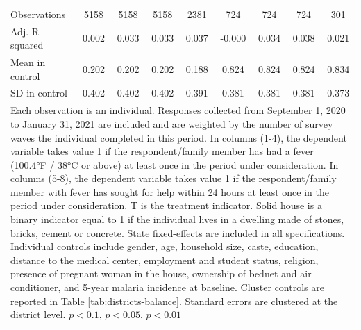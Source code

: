 {{\begin{tabular}{l*{8}{c}}
\hline
Observations    &\num{5158}         &\num{5158}         &\num{5158}         &\num{2381}         &\num{724}         &\num{724}         &\num{724}         &\num{301}         \\
Adj. R-squared  &    0.002         &    0.033         &    0.033         &    0.037         &   -0.000         &    0.034         &    0.038         &    0.021         \\
Mean in control &    0.202         &    0.202         &    0.202         &    0.188         &    0.824         &    0.824         &    0.824         &    0.834         \\
SD in control   &    0.402         &    0.402         &    0.402         &    0.391         &    0.381         &    0.381         &    0.381         &    0.373         \\
\hline\hline
\multicolumn{9}{p{1.02\linewidth}}{\scriptsize Each observation is an individual. Responses collected from September 1, 2020 to January 31, 2021 are included and are weighted by the number of survey waves the individual completed in this period. In columns (1-4), the dependent variable takes value 1 if the respondent/family member has had a fever (100.4°F / 38°C or above) at least once in the period under consideration. In columns (5-8), the dependent variable takes value 1 if the respondent/family member with fever has sought for help within 24 hours at least once in the period under consideration. T is the treatment indicator. Solid house is a binary indicator equal to 1 if the individual lives in a dwelling made of stones, bricks, cement or concrete. State fixed-effects are included in all specifications. Individual controls include gender, age, household size, caste, education, distance to the medical center, employment and student status, religion, presence of pregnant woman in the house, ownership of bednet and air conditioner, and 5-year malaria incidence at baseline. Cluster controls are reported in Table \ref{tab:districts-balance}. Standard errors are clustered at the district level. \sym{*} \(p<0.1\), \sym{**} \(p<0.05\), \sym{***} \(p<0.01\)}\\
\end{tabular}
}%

}
